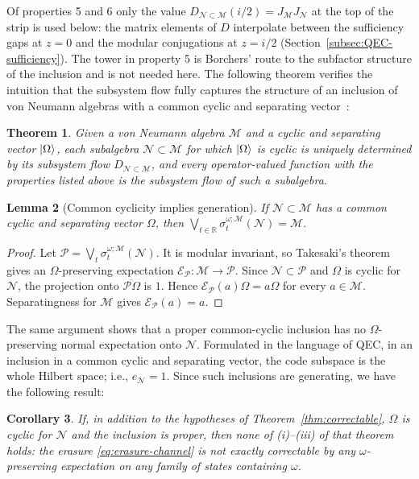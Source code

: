\documentclass[a4paper,11pt]{article}
\newtheorem{theorem}{Theorem}
\newtheorem{lemma}[theorem]{Lemma}
\newtheorem{corollary}[theorem]{Corollary}
\theoremstyle{definition}
\newcommand{\mP}{\mathcal{P}}
\newcommand{\mN}{\mathcal{N}}
\newcommand{\mM}{\mathcal{M}}
\newcommand{\mE}{\mathcal{E}}
\begin{document}
Of properties 5 and 6 only the value $D_{\mN\subset\mM}(i/2)=J_{\mM}J_{\mN}$ at the top of the strip is used below: the matrix elements of $D$ interpolate between the sufficiency gaps at $z=0$ and the modular conjugations at $z=i/2$ (Section~\ref{subsec:QEC-sufficiency}). The tower in property 5 is Borchers' route to the subfactor structure of the inclusion and is not needed here. The following theorem verifies the intuition that the subsystem flow fully captures the structure of an inclusion of von Neumann algebras with a common cyclic and separating vector~\cite{revolutionizing}:
\begin{theorem}
    Given a von Neumann algebra $\mM$ and a cyclic and separating vector $\ket{\Omega}$, each subalgebra $\mN\subset\mM$ for which $\ket{\Omega}$ is cyclic is uniquely determined by its subsystem flow $D_{\mN\subset\mM}$, and every operator-valued function with the properties listed above is the subsystem flow of such a subalgebra.
\end{theorem}

\begin{lemma}[Common cyclicity implies generation]\label{lem:common-cyclicity-generating}
If $\mN\subset\mM$ has a common cyclic and separating vector $\Omega$, then
$\bigvee_{t\in\mathbb R}\sigma^{\omega;\mM}_t(\mN)=\mM$.
\end{lemma}
\begin{proof}
Let $\mP=\bigvee_t\sigma^{\omega;\mM}_t(\mN)$. It is modular invariant, so Takesaki's theorem
gives an $\Omega$-preserving expectation $\mE_{\mP}:\mM\to\mP$.
Since $\mN\subset\mP$ and $\Omega$ is cyclic for $\mN$, the projection onto
$\overline{\mP\Omega}$ is $1$. Hence $\mE_{\mP}(a)\Omega=a\Omega$ for every $a\in\mM$.
Separatingness for $\mM$ gives $\mE_{\mP}(a)=a$.
\end{proof}
The same argument shows that a proper common-cyclic inclusion has no
$\Omega$-preserving normal expectation onto $\mN$. Formulated in the language of QEC, in an inclusion in a common cyclic and separating vector, the code subspace is the whole Hilbert space; i.e., $e_{\mN}=1$. Since such inclusions are generating, we have the following result:

\begin{corollary}\label{cor:common-cyclic-noncorrectable}
If, in addition to the hypotheses of Theorem~\ref{thm:correctable}, $\Omega$ is cyclic for $\mN$ and the inclusion is proper, then none of {\rm(i)--(iii)} of that theorem holds: the erasure \eqref{eq:erasure-channel} is not exactly correctable by any $\omega$-preserving expectation on any family of states containing $\omega$.
\end{corollary}
\end{document}
